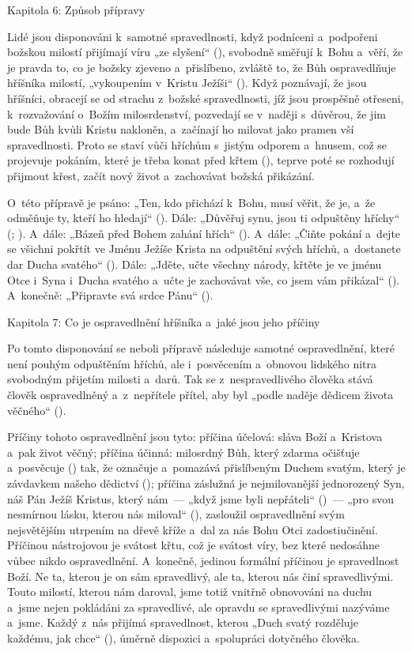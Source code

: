 \chaptitle
Kapitola 6:
Způsob přípravy

Lidé jsou disponováni k~samotné spravedlnosti, když podníceni a~podpořeni božskou
milostí přijímají víru „ze slyšení“ (), svobodně směřují k~Bohu a~věří,
že je pravda to, co je božsky zjeveno a~přislíbeno, zvláště to, že Bůh ospravedlňuje
hříšníka milostí, „vykoupením v~Kristu Ježíši“ (). Když poznávají, že jsou
hříšníci, obracejí se od strachu z~božské spravedlnosti, jíž jsou prospěšně otřeseni,
k~rozvažování o~Božím milosrdenství, pozvedají se v~naději s~důvěrou, že jim bude
Bůh kvůli Kristu nakloněn, a~začínají ho milovat jako pramen vší spravedlnosti.
Proto se staví vůči hříchům s~jistým odporem a~hnusem, což se projevuje pokáním,
které je třeba konat před křtem (), teprve poté se rozhodují přijmout křest,
začít nový život a~zachovávat božská přikázání.

O~této přípravě je psáno: „Ten, kdo přichází k~Bohu, musí věřit, že je, a~že odměňuje
ty, kteří ho hledají“ (). Dále: „Důvěřuj synu, jsou ti odpuštěny hříchy“
(; ). A~dále: „Bázeň před Bohem zahání hřích“ (). A~dále: „Čiňte
pokání a~dejte se všichni pokřtít ve Jménu Ježíše Krista na odpuštění svých hříchů,
a~dostanete dar Ducha svatého“ (). Dále: „Jděte, učte všechny národy, křtěte
je ve jménu Otce i~Syna i~Ducha svatého a~učte je zachovávat vše, co jsem vám přikázal“
(). A~konečně: „Připravte svá srdce Pánu“ ().

\chaptitle
Kapitola 7:
Co je ospravedlnění hříšníka a~jaké jsou jeho příčiny

Po tomto disponování se neboli přípravě následuje samotné ospravedlnění, které není
pouhým odpuštěním hříchů, ale i~posvěcením a~obnovou lidského nitra svobodným přijetím
milosti a~darů. Tak se z~nespravedlivého člověka stává člověk ospravedlněný a~z~nepřítele
přítel, aby byl „podle naděje dědicem života věčného“ ().

Příčiny tohoto ospravedlnění jsou tyto: příčina účelová: sláva Boží a~Kristova a~pak
život věčný; příčina účinná: milosrdný Bůh, který zdarma očišťuje a~posvěcuje
() tak, že označuje a~pomazává přislíbeným Duchem svatým, který je závdavkem
našeho dědictví (); příčina záslužná je nejmilovanější jednorozený Syn,
náš Pán Ježíš Kristus, který nám~— „když jsme byli nepřáteli“ ()~— „pro
svou nesmírnou lásku, kterou nás miloval“ (), zasloužil ospravedlnění svým
nejsvětějším utrpením na dřevě kříže a~dal za nás Bohu Otci zadostiučinění. Příčinou
nástrojovou je svátost křtu, což je svátost víry, bez které nedosáhne vůbec nikdo
ospravedlnění. A~konečně, jedinou formální příčinou je spravedlnost Boží. Ne ta,
kterou je on sám spravedlivý, ale ta, kterou nás činí spravedlivými. Touto milostí,
kterou nám daroval, jsme totiž vnitřně obnovováni na duchu a~jsme nejen pokládáni
za spravedlivé, ale opravdu se spravedlivými nazýváme a~jsme. Každý z~nás přijímá
spravedlnost, kterou „Duch svatý rozděluje každému, jak chce“ (), úměrně
dispozici a~spolupráci dotyčného člověka.

